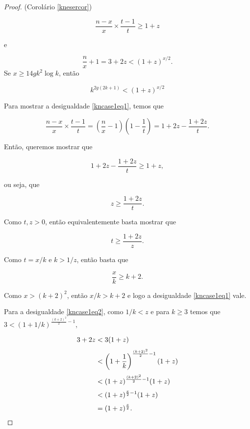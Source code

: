 \documentclass{article}
\begin{document}
\begin{proof}{(Corolário \ref{knesercor})}


\begin{equation}\label{kncase1eq1}
\frac{n-x}{x}\times \frac{t-1}{t} \geq 1+z
\end{equation}

e

\begin{equation}\label{kncase1eq2}
\frac{n}{x}+1 = 3+2z < (1+z)^{x/2}.
\end{equation}
Se $x \geq 14gk^2\log k$, então

\begin{equation}\label{kncase1eq3}
k^{2g(2k+1)} < (1+z)^{x/2}
\end{equation}

Para mostrar a desigualdade \ref{kncase1eq1}, temos que

\[\frac{n-x}{x}\times \frac{t-1}{t} = \left(\frac{n}{x} - 1\right)\left(1 - \frac{1}{t}\right) = 1 + 2z - \frac{1+2z}{t}.\]

Então, queremos mostrar que

\[1 + 2z - \frac{1+2z}{t} \geq 1 + z,\]

ou seja, que

\[z \geq \frac{1+2z}{t}.\]

Como $t,z > 0$, então equivalentemente basta mostrar que 

\[t \geq \frac{1+2z}{z}.\]

Como $t = x/k$ e $k > 1/z$, então basta que

\[\frac{x}{k} \geq k + 2.\]

Como $x>(k+2)^2$, então $x/k > k+2$ e logo a desigualdade \ref{kncase1eq1} vale.

Para a desigualdade \ref{kncase1eq2}, como $1/k < z$ e para $k\geq 3$ temos que $3 < (1+1/k)^{\frac{(k+2)^2}{2}-1}$,


\begin{equation*}
\setlength{\jot}{6pt}
\begin{aligned}
3 + 2z & < 3(1+z)\\
& < \left(1+\frac{1}{k}\right)^{\frac{(k+2)^2}{2}-1}(1+z)\\
& < (1+z)^{\frac{(k+2)^2}{2}-1}(1+z)\\
& < (1+z)^{\frac{x}{2}-1}(1+z) \\
& = (1+z)^{\frac{x}{2}}.
\end{aligned}
\end{equation*}


\end{proof}
\end{document}
